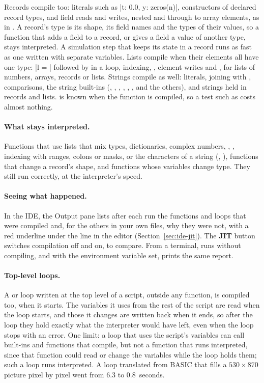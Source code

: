 \documentclass[11pt,a4paper,openany]{report}
\begin{document}
{{Records compile too: literals such as \code|{t: 0.0, y: zeros(n)}|,
constructors of declared record types, and field reads and writes, nested and
through to array elements, as in . A record's
type is its shape, its field names and the types of their values, so a
function that adds a field to a record, or gives a field a value of another
type, stays interpreted. A simulation step that keeps its state in a record
runs as fast as one written with separate variables. Lists compile when their
elements all have one type: \code|l = {}| followed by
 in a loop, indexing, , element writes
and , for lists of numbers, arrays, records or lists.
Strings compile as well: literals, joining with \code{+}, comparisons, the
string built-ins (, , , ,
, ,  and the others), and strings held
in records and lists.  is known when the function is
compiled, so a test such as  costs almost nothing.

\paragraph{What stays interpreted.} Functions that use lists that mix
types, dictionaries, complex numbers, , , indexing
with ranges, colons or masks, or the characters of a string (,
), functions that change a record's shape, and functions whose
variables change type. They still run correctly, at the
interpreter's speed.

\paragraph{Seeing what happened.} In the IDE, the Output pane lists after each
run the functions and loops that were compiled and, for the others in your
own files, why they were not, with a red underline under the line in the
editor (Section~\ref{sec:ide-jit}). The \textbf{JIT} button switches
compilation off and on, to compare. From a terminal,
 runs without compiling, and with the
environment variable  set,  prints the same report.

\paragraph{Top-level loops.} A  or  loop written at the
top level of a script, outside any function, is compiled too, when it starts.
The variables it uses from the rest of the script are read when the loop
starts, and those it changes are written back when it ends, so after the loop
they hold exactly what the interpreter would have left, even when the loop
stops with an error. One limit: a loop that uses the script's variables can
call built-ins and functions that compile, but not a function that runs
interpreted, since that function could read or change the variables while
the loop holds them; such a loop runs interpreted. A loop translated from
BASIC that fills a $530\times870$ picture pixel by pixel went from 6.3 to
0.8~seconds.

}}
\end{document}
